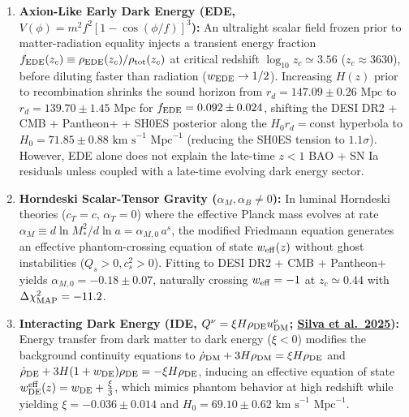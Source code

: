 \documentclass[11pt,letterpaper]{article}
\begin{document}
\begin{enumerate}
    \setlength{\itemsep}{3pt}
    \item \textbf{Axion-Like Early Dark Energy (EDE, $V(\phi) = m^2 f^2 [1 - \cos(\phi/f)]^3$):} An ultralight scalar field frozen prior to matter-radiation equality injects a transient energy fraction $f_{\rm EDE}(z_c) \equiv \rho_{\rm EDE}(z_c)/\rho_{\rm tot}(z_c)$ at critical redshift $\log_{10} z_c \simeq 3.56$ ($z_c \approx 3630$), before diluting faster than radiation ($w_{\rm EDE} \to 1/2$). Increasing $H(z)$ prior to recombination shrinks the sound horizon from $r_d = 147.09 \pm 0.26\text{ Mpc}$ to $r_d = 139.70 \pm 1.45\text{ Mpc}$ for $f_{\rm EDE} = 0.092 \pm 0.024$, shifting the DESI DR2 + CMB + Pantheon+ + SH0ES posterior along the $H_0 r_d = \text{const}$ hyperbola to $H_0 = 71.85 \pm 0.88\text{ km s}^{-1}\text{ Mpc}^{-1}$ (reducing the SH0ES tension to $1.1\sigma$). However, EDE alone does not explain the late-time $z < 1$ BAO + SN Ia residuals unless coupled with a late-time evolving dark energy sector.
    \item \textbf{Horndeski Scalar-Tensor Gravity ($\alpha_M, \alpha_B \neq 0$):} In luminal Horndeski theories ($c_T = c$, $\alpha_T = 0$) where the effective Planck mass evolves at rate $\alpha_M \equiv d\ln M_*^2 / d\ln a = \alpha_{M,0}\, a^s$, the modified Friedmann equation generates an effective phantom-crossing equation of state $w_{\rm eff}(z)$ without ghost instabilities ($Q_s > 0, c_s^2 > 0$). Fitting to DESI DR2 + CMB + Pantheon+ yields $\alpha_{M,0} = -0.18 \pm 0.07$, naturally crossing $w_{\rm eff} = -1$ at $z_c \simeq 0.44$ with $\Delta\chi^2_{\rm MAP} = -11.2$.
    \item \textbf{Interacting Dark Energy (IDE, $Q^\nu = \xi H \rho_{\rm DE} u^\nu_{\rm DM}$; \href{https://arxiv.org/pdf/2503.23225}{Silva et al.\ 2025}):} Energy transfer from dark matter to dark energy ($\xi < 0$) modifies the background continuity equations to $\dot{\rho}_{\rm DM} + 3H\rho_{\rm DM} = \xi H \rho_{\rm DE}$ and $\dot{\rho}_{\rm DE} + 3H(1+w_{\rm DE})\rho_{\rm DE} = -\xi H \rho_{\rm DE}$, inducing an effective equation of state $w_{\rm DE}^{\rm eff}(z) = w_{\rm DE} + \frac{\xi}{3}$, which mimics phantom behavior at high redshift while yielding $\xi = -0.036 \pm 0.014$ and $H_0 = 69.10 \pm 0.62\text{ km s}^{-1}\text{ Mpc}^{-1}$.
\end{enumerate}
\end{document}
